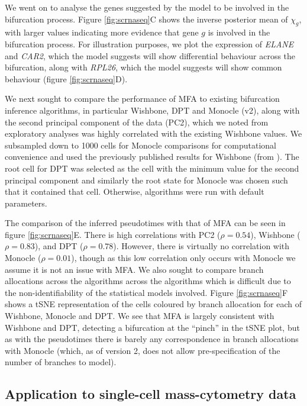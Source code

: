We went on to analyse the genes suggested by the model to be involved in the bifurcation process. Figure \ref{fig:scrnaseq}C shows the inverse posterior mean of $\chi_g$, with larger values indicating more evidence that gene $g$ is involved in the bifurcation process. For illustration purposes, we plot the expression of \emph{ELANE} and \emph{CAR2}, which the model suggests will show differential behaviour across the bifurcation, along with \emph{RPL26}, which the model suggests will show common behaviour (figure \ref{fig:scrnaseq}D).

We next sought to compare the performance of MFA to existing bifurcation inference algorithms, in particular Wishbone, DPT and Monocle (v2), along with the second principal component of the data (PC2), which we noted from exploratory analyses was highly correlated with the existing Wishbone values.
We subsampled down to 1000 cells for Monocle comparisons for computational convenience and used the previously published results for Wishbone  (from \cite{setty2016wishbone}).
The root cell for DPT was selected as the cell with the minimum value for the second principal component and similarly the root state for Monocle was chosen such that it contained that cell. Otherwise, algorithms were run with default parameters.

The comparison of the inferred pseudotimes with that of MFA can be seen in figure \ref{fig:scrnaseq}E. There is high correlations with PC2 ($\rho = 0.54$), Wishbone ($\rho = 0.83$), and DPT ($\rho = 0.78$). However, there is virtually no correlation with Monocle ($\rho = 0.01$), though as this low correlation only occurs with Monocle we assume it is not an issue with MFA. We also sought to compare branch allocations across the algorithms across the algorithms which is difficult due to the non-identifiability of the statistical models involved. Figure \ref{fig:scrnaseq}F shows a tSNE representation of the cells coloured by branch allocation for each of Wishbone, Monocle and DPT. We see that MFA is largely consistent with Wishbone and DPT, detecting a bifurcation at the ``pinch'' in the tSNE plot, but as with the pseudotimes there is barely any correspondence in branch allocations with Monocle (which, as of version 2, does not allow pre-specification of the number of branches to model).

\subsection{Application to single-cell mass-cytometry data}

